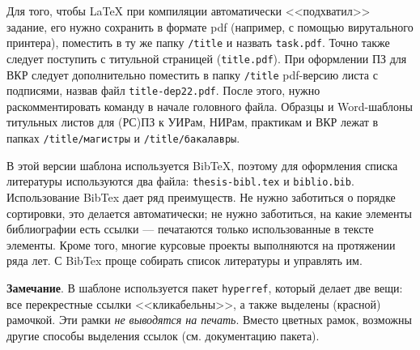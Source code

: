 Для того, чтобы \LaTeX{} при компиляции автоматически <<подхватил>> задание, его нужно сохранить в формате pdf (например, с помощью вирутального принтера), поместить в ту же папку \texttt{/title} и назвать \texttt{task.pdf}. Точно также следует поступить с титульной страницей (\texttt{title.pdf}). При оформлении ПЗ для ВКР следует дополнительно поместить в папку \texttt{/title} pdf-версию листа с подписями, назвав файл \texttt{title-dep22.pdf}. После этого, нужно раскомментировать команду \verb|| в начале головного файла. Образцы и Word-шаблоны титульных листов для (РС)ПЗ к УИРам, НИРам, практикам и ВКР лежат в папках \texttt{/title/магистры} и \texttt{/title/бакалавры}.

В этой версии шаблона используется BibTeX, поэтому для оформления списка
литературы используются два файла: \texttt{thesis-bibl.tex} и
\texttt{biblio.bib}. Использование BibTex дает ряд преимуществ. Не нужно
заботиться о порядке сортировки, это делается автоматически; не нужно заботиться,
на какие элементы библиографии есть ссылки --- печатаются только использованные в
тексте элементы. Кроме того, многие курсовые проекты выполняются на протяжении ряда лет. С BibTex проще собирать список литературы и управлять им.

\textbf{Замечание}. В шаблоне используется пакет \texttt{hyperref}, который делает две вещи: все перекрестные ссылки <<кликабельны>>, а также выделены (красной) рамочкой. Эти рамки \textit{не выводятся на печать}. Вместо цветных рамок, возможны другие способы выделения ссылок (см. документацию пакета).
